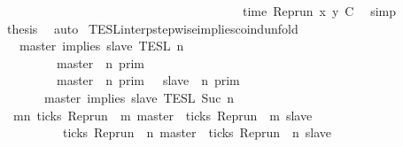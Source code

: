 \begin{isabellebody}
\ \ \ \ \ \ \ \ \ \ \ \ \ \ \ \ \ \ \ \ \ \ \ \ \ \ \ \ \ \ \ \ \ \ \ \ \ \ \ time\ {\isacharparenleft}{\isacharparenleft}Rep{\isacharunderscore}run\ x{\isacharparenright}\ y\ C\ \isamarkupfalse%
\ simp\isanewline
\ \ \isamarkupfalse%
\ {\isacharquery}thesis\ \isamarkupfalse%
\ auto\isanewline
{}\isamarkupfalse%
%
\endisatagproof
{\isafoldproof}%
%
\isadelimproof
\isanewline
%
\endisadelimproof
\isanewline
{}\isamarkupfalse%
\ TESL{\isacharunderscore}interp{\isacharunderscore}stepwise{\isacharunderscore}implies{\isacharunderscore}coind{\isacharunderscore}unfold{\isacharcolon}\isanewline
\ \ {\isacartoucheopen}{\isasymlbrakk}\ master\ implies\ slave\ {\isasymrbrakk}\isactrlsub T\isactrlsub E\isactrlsub S\isactrlsub L\isactrlbsup {\isasymge}\ n\isactrlesup \ {\isacharequal}\isanewline
\ \ \ \ \ {\isacharparenleft}\ \ \ {\isasymlbrakk}\ master\ {\isasymnot}{\isasymUp}\ n\ {\isasymrbrakk}\isactrlsub p\isactrlsub r\isactrlsub i\isactrlsub m\ \ \ \ \ \ \ \ \ \ \ \ \ \ \ \ \ \ \ \ \ %
\isanewline
\ \ \ \ \ \ \ {\isasymunion}\ {\isasymlbrakk}\ master\ {\isasymUp}\ n\ {\isasymrbrakk}\isactrlsub p\isactrlsub r\isactrlsub i\isactrlsub m\ {\isasyminter}\ {\isasymlbrakk}\ slave\ {\isasymUp}\ n\ {\isasymrbrakk}\isactrlsub p\isactrlsub r\isactrlsub i\isactrlsub m{\isacharparenright}\ \ %
\isanewline
\ \ \ \ \ {\isasyminter}\ {\isasymlbrakk}\ master\ implies\ slave\ {\isasymrbrakk}\isactrlsub T\isactrlsub E\isactrlsub S\isactrlsub L\isactrlbsup {\isasymge}\ Suc\ n\isactrlesup {\isacartoucheclose}\isanewline
%
\isadelimproof
%
\endisadelimproof
%
\isatagproof
{}\isamarkupfalse%
\ {\isacharminus}\isanewline
\ \ \isamarkupfalse%
\ {\isacartoucheopen}{\isacharbraceleft}{\isasymrho}{\isachardot}\ {\isasymforall}m{\isasymge}n{\isachardot}\ ticks\ {\isacharparenleft}{\isacharparenleft}Rep{\isacharunderscore}run\ {\isasymrho}{\isacharparenright}\ m\ master{\isacharparenright}\ {\isasymlongrightarrow}\ ticks\ {\isacharparenleft}{\isacharparenleft}Rep{\isacharunderscore}run\ {\isasymrho}{\isacharparenright}\ m\ slave{\isacharparenright}{\isacharbraceright}\isanewline
\ \ \ \ \ \ \ \ {\isacharequal}\ {\isacharbraceleft}{\isasymrho}{\isachardot}\ ticks\ {\isacharparenleft}{\isacharparenleft}Rep{\isacharunderscore}run\ {\isasymrho}{\isacharparenright}\ n\ master{\isacharparenright}\ {\isasymlongrightarrow}\ ticks\ {\isacharparenleft}{\isacharparenleft}Rep{\isacharunderscore}run\ {\isasymrho}{\isacharparenright}\ n\ slave{\isacharparenright}{\isacharbraceright}\isanewline

\end{isabellebody}
